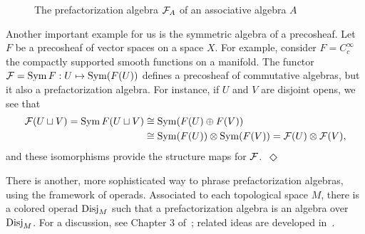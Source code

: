 \documentclass[11pt]{amsart}
\begin{document}
\begin{figure}
\begin{center}
\end{center}
\caption{The prefactorization algebra $\mathcal F_A$ of an associative algebra $A$}
\label{fig:assasfact}
\end{figure}

\begin{eg}\label{ex:SymOfCosheaf}
Another important example for us is the symmetric algebra of a precosheaf. 
Let $F$ be a precosheaf of vector spaces on a space $X$. 
For example, consider $F = C^\infty_c$ the compactly supported smooth functions on a manifold. The functor $\mathcal F  = \operatorname{Sym} F: U \mapsto \operatorname{Sym}(F(U))$ defines a precosheaf of commutative algebras, but it also a prefactorization algebra. For instance, if $U$ and $V$ are disjoint opens, we see that
\begin{align*}
\mathcal F(U \sqcup V) = \operatorname{Sym} F(U \sqcup V) & \cong \operatorname{Sym} (F(U) \oplus F(V)) \\ & \cong \operatorname{Sym}(F(U)) \otimes \operatorname{Sym}(F(V)) = \mathcal F(U) \otimes \mathcal F(V),
\end{align*}
and these isomorphisms provide the structure maps for $\mathcal F$.~\hfill$\Diamond$
\end{eg}

There is another, more sophisticated way to phrase prefactorization algebras, using the framework of operads.
Associated to each topological space $M$, there is a colored operad $\operatorname{Disj}_M$ such that a prefactorization algebra is an algebra over~$\operatorname{Disj}_M$.
For a discussion, see Chapter 3 of~\cite{CG1};
related ideas are developed in~\cite{AF, LurieHA, Ginot}.
\end{document}
